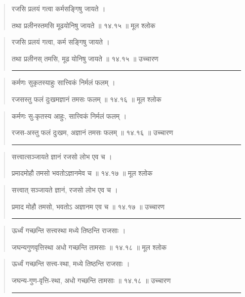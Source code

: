 \begin{quotation}

रजसि प्रलयं गत्वा कर्मसङ्‍गिषु जायते  ।  

तथा प्रलीनस्तमसि मूढयोनिषु जायते  ॥ १४.१५ ॥  मूल श्लोक
\end{quotation}

\begin{quotation}

रजसि प्रलयं गत्वा, कर्म सङ्‍गिषु जायते  ।  

तथा प्रलीनस् तमसि, मूढ योनिषु जायते  ॥ १४.१५ ॥  उच्चारण

\noindent\rule{16cm}{0.4pt} 
\end{quotation}


\begin{quotation}

कर्मणः सुकृतस्याहुः सात्त्विकं निर्मलं फलम्‌  ।  

रजसस्तु फलं दुःखमज्ञानं तमसः फलम्‌  ॥ १४.१६ ॥  मूल श्लोक
\end{quotation}

\begin{quotation}

कर्मणः सु-कृतस्य आहुः, सात्त्विकं निर्मलं फलम्‌  ।  

रजस-अस्तु फलं दुःखम, अज्ञानं तमसः फलम्‌  ॥ १४.१६ ॥  उच्चारण

\noindent\rule{16cm}{0.4pt} 
\end{quotation}


\begin{quotation}

सत्त्वात्सञ्जायते ज्ञानं रजसो लोभ एव च  ।  

प्रमादमोहौ तमसो भवतोऽज्ञानमेव च  ॥ १४.१७ ॥  मूल श्लोक
\end{quotation}

\begin{quotation}

सत्त्वात् सञ्जायते ज्ञानं, रजसो लोभ एव च  ।  

प्रमाद मोहौ तमसो, भवतोऽ अज्ञानम एव च  ॥ १४.१७ ॥  उच्चारण

\noindent\rule{16cm}{0.4pt} 
\end{quotation}


\begin{quotation}
ऊर्ध्वं गच्छन्ति सत्त्वस्था मध्ये तिष्ठन्ति राजसाः  ।  

जघन्यगुणवृत्तिस्था अधो गच्छन्ति तामसाः  ॥ १४.१८ ॥  मूल श्लोक
\end{quotation}

\begin{quotation}

ऊर्ध्वं गच्छन्ति सत्त्व-स्था, मध्ये तिष्ठन्ति राजसाः  ।  

जघन्य-गुण-वृत्ति-स्था, अधो गच्छन्ति तामसाः  ॥ १४.१८ ॥  उच्चारण

\noindent\rule{16cm}{0.4pt} 
\end{quotation}


